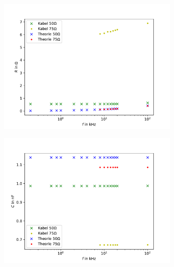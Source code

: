 \begin{figure}[h]
	\centering
	\begin{subfigure}{0.496\textwidth}
		\centering
		\includegraphics[width=\textwidth]{RLC_DirekteMessung/build/PlotR.pdf}
		\label{fig:PlotR}
	\end{subfigure}
	\begin{subfigure}{0.496\textwidth}
		\centering
		\includegraphics[width=\textwidth]{RLC_DirekteMessung/build/PlotC.pdf}
		\label{fig:PlotC}
	\end{subfigure}
	\begin{subfigure}{0.496\textwidth}
		\centering

\end{subfigure}
\end{figure}
